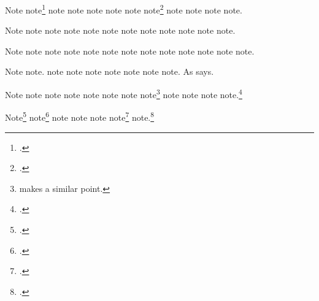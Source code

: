 \documentclass[a4paper,12pt]{report}
\begin{document}
Note\autocite{schweitzer:bach}
note\footnote{.}
note\autocite{shapey:partita} note\autocite{sechzer:women}
note\autocite{sirosh:visualcortex} note\autocite{sereny:cries}
note\autocite{silver:gawain}
note\footnote{.}
note\autocite{soltes:georgia} note\autocite{sirosh:visualcortex}
note\autocite{spock:interview} note\autocite{shapey:partita}.

Note\autocite{stenger:privacy} note\autocite{silver:gawain}
note\autocite{tillich:system} note\autocite{soltes:georgia}
note\autocite{spock:interview} note\autocite{times:guide}
note\autocite{twain:audio} note\autocite{virginia:plantation}
note\autocite{stenger:privacy} note\autocite{chicago:manual}
note\autocite{twain:audio} note\autocite[2:45]{tillich:system}.

Note\autocite[police ranks]{times:guide}
note\autocite{virginia:plantation} note\autocite{chicago:manual}
note\autocite{unsigned:ranke} note\autocite{herwign:office}
note\autocite{verdi:corsaro} note\autocite{wallraff:word}
note\autocite{unsigned:ranke} note\autocite{warr:ellison}
note\autocite{herwign:office} note\autocite{wallraff:word}
note\autocite{verdi:corsaro} note\autocite{wauchope:ceramics}.

Note\autocite{weed:flatiron} note\autocite{weresz}.
note\autocite{white:callimachus} note\autocite{white:ross:memo}
note\autocite{warr:ellison} note\autocite{weed:flatiron}
note\autocite{wikiped:bibtex} note\autocite{will:cohere}
note\autocite{wauchope:ceramics}.  As \textcite{zukowsky:chicago}
says.

Note\autocite{weresz} note\autocite{white:russ}
note\autocite{white:callimachus} note\autocite{white:ross:memo}
note\autocite{white:russ} note\autocite[BibTeX]{wikiped:bibtex}
note\autocite{will:cohere} note\footnote{\textcite{zukowsky:chicago}
  makes a similar point.}
note\autocites[See][3.2.996b5--8]{aristotle:metaphy:gr}[360e--361b]
{plato:republic:gr}[and also][for additional
information]{white:callimachus} note\autocite{aristotle:metaphy:trans}
note\autocites[See][]{mchugh:wake}[and][569]{warr:ellison}
note.\footnote{.}

Note\footnote{.}
note\footnote{.}
note\autocite[3:126]{meredith:letters} note
note\autocite[2]{weresz} note\footnote{.}
note.\footnote{\cite*{zukowsky:chicago}.}

\nocite{furet:related,house:papers}

\printshorthands

\printbibliography[notkeyword=original]
\end{document}
